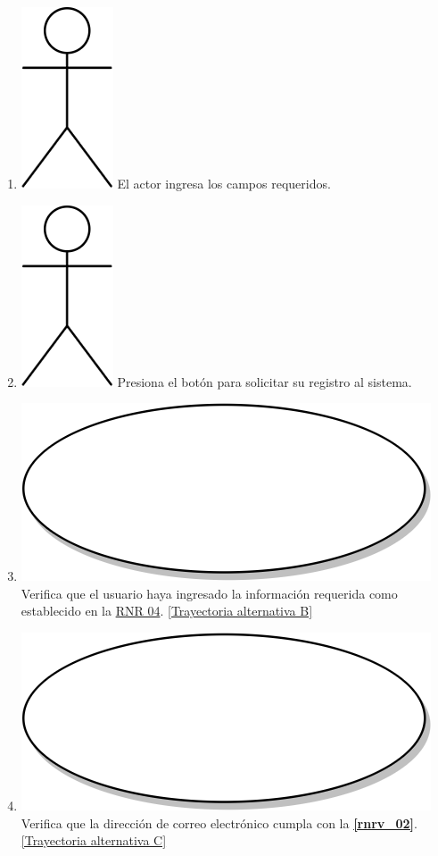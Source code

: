\begin{enumerate}
  \item {\includegraphics[scale=.1]{Capitulo3/img/actor.png} El actor ingresa los campos requeridos.}
  \item {\includegraphics[scale=.1]{Capitulo3/img/actor.png} Presiona el botón para solicitar su registro al sistema.}
  \item {\includegraphics[scale=.05]{Capitulo3/img/proceso.png} Verifica que el usuario haya ingresado la información requerida como establecido en la \hyperref[rnr_04]{RNR 04}. \hyperref[cu2_ta_b]{[Trayectoria alternativa B]}}
  \item {\includegraphics[scale=.05]{Capitulo3/img/proceso.png} Verifica que la dirección de correo electrónico cumpla con la \textbf{\ref{rnrv_02}}. \hyperref[cu2_ta_c]{[Trayectoria alternativa C]}}

\end{enumerate}
